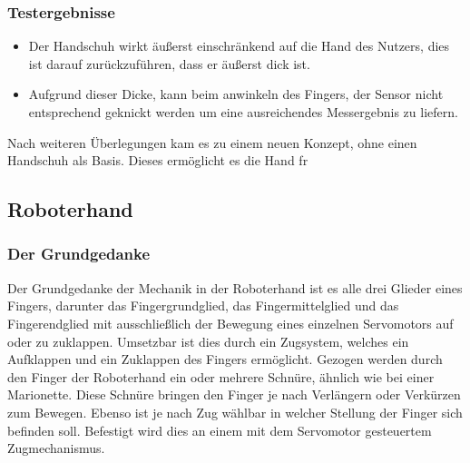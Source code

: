 \documentclass[titlepage,12pt,twoside]{article}
\begin{document}
\subsubsection{Testergebnisse}
\begin{itemize}
	\item Der Handschuh wirkt äußerst einschränkend auf die Hand des Nutzers, dies 
	ist darauf zurückzuführen, dass er äußerst dick ist.
	\item Aufgrund dieser Dicke, kann beim anwinkeln des Fingers, der Sensor nicht 
	entsprechend geknickt werden um eine ausreichendes Messergebnis zu liefern.
\end{itemize}
\hfill \break
Nach weiteren Überlegungen kam es zu einem neuen Konzept, ohne einen Handschuh als 
Basis. Dieses ermöglicht es die Hand fr


\newpage
\subsection{Roboterhand}
\subsubsection{Der Grundgedanke}
Der Grundgedanke der Mechanik in der Roboterhand ist es alle drei Glieder eines Fingers,
darunter das Fingergrundglied, das Fingermittelglied und das Fingerendglied mit 
ausschließlich der Bewegung eines einzelnen Servomotors auf oder zu zuklappen. 
Umsetzbar ist dies durch ein Zugsystem, welches ein Aufklappen und ein Zuklappen 
des Fingers ermöglicht. Gezogen werden durch den Finger der Roboterhand ein oder mehrere 
Schnüre, ähnlich wie bei einer Marionette. Diese Schnüre bringen den Finger je nach 
Verlängern oder Verkürzen zum Bewegen. Ebenso ist je nach Zug wählbar in welcher 
Stellung der Finger sich befinden soll. Befestigt wird dies an einem mit dem Servomotor 
gesteuertem Zugmechanismus. \\
\end{document}
